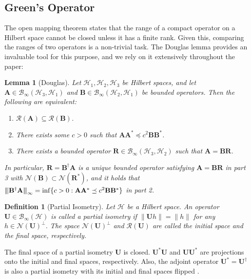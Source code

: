 \documentclass[noinfoline]{imsart}\setcounter{tocdepth}{2}
\newcommand{\m}[1]{\mathbf{#1}} %
\renewcommand{\c}[1]{\mathcal{#1}} %
\newcommand{\vertii}[1]{{\vert\kern-0.25ex\vert\kern-0.25ex\vert #1 
    \vert\kern-0.25ex\vert\kern-0.25ex\vert}} %
\theoremstyle{plain}
\newtheorem{lemma}[theorem]{Lemma}
\newtheorem{definition}{Definition}[section]
\begin{document}
\subsection{Green's Operator}
The open mapping theorem states that the range of a compact operator on a Hilbert space cannot be closed unless it has a finite rank. Given this, comparing the ranges of two operators is a non-trivial task. The Douglas lemma \cite{douglas1966majorization} provides an invaluable tool for this purpose, and we rely on it extensively throughout the paper:

\begin{lemma}[Douglas]
Let $\c{H}_{1}, \c{H}_{2}, \c{H}_{3}$ be Hilbert spaces, and let $\m{A} \in \c{B}_{\infty}(\c{H}_{3}, \c{H}_{1})$ and $\m{B} \in \c{B}_{\infty}(\c{H}_{2}, \c{H}_{1})$ be bounded operators. Then the following are equivalent:
\begin{enumerate}[leftmargin = *]
    \item $\c{R}(\m{A}) \subseteq \c{R}(\m{B})$. 
    \item There exists some $c > 0$ such that $\m{A} \m{A}^{*} \preceq c^{2} \m{B} \m{B}^{*}$.
    \item There exists a bounded operator $\m{R} \in \c{B}_{\infty}(\c{H}_{3}, \c{H}_{2})$ such that $\m{A} = \m{B} \m{R}$.
\end{enumerate}
In particular, $\m{R} = \m{B}^{\dagger} \m{A}$ is a unique bounded operator satisfying $\m{A} = \m{B} \m{R}$ in part 3 with $\c{N}(\m{B}) \subset \c{N}(\m{R}^{*})$, and it holds that $\vertii{\m{B}^{\dagger} \m{A}}_{\infty} = \inf \{ c> 0 : \m{A} \m{A}^{*} \preceq c^{2} \m{B} \m{B}^{*} \}$ in part 2.
\end{lemma}

\begin{definition}[Partial Isometry]
Let $\c{H}$ be a Hilbert space. An operator $\m{U} \in \c{B}_{\infty}(\c{H})$ is called a \emph{partial isometry} if $\|\m{U} h \| = \|h \|$ for any $h \in \c{N}(\m{U})^{\perp}$. The space $\c{N}(\m{U})^{\perp}$ and $\c{R}(\m{U})$ are called the \emph{initial space} and the \emph{final space}, respectively.
\end{definition}

The final space of a partial isometry $\m{U}$ is closed. $\m{U}^{*} \m{U}$ and $\m{U} \m{U}^{*}$ are projections onto the initial and final spaces, respectively.
Also, the adjoint operator $\m{U}^{*} = \m{U}^{\dagger}$ is also a partial isometry with its initial and final spaces flipped \cite{conway2019course}.
\end{document}
